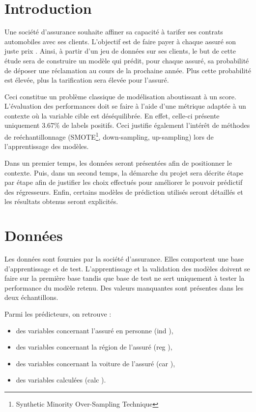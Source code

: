 \documentclass[french]{article}
\begin{document}
\begin{multicols}{2}
\section{Introduction}


Une société d'assurance souhaite affiner sa capacité à tarifer ses contrats automobiles avec ses clients. L'objectif est de faire payer à chaque assuré son \og juste prix \fg{}. Ainsi, à partir d'un jeu de données sur ses clients, le but de cette étude sera de construire un modèle qui prédit, pour chaque assuré, sa probabilité de déposer une réclamation au cours de la prochaine année. Plus cette probabilité est élevée, plus la tarification sera élevée pour l'assuré.


Ceci constitue un problème classique de modélisation aboutissant à un score. L'évaluation des performances doit se faire à l'aide d'une métrique adaptée à un contexte où la variable cible est déséquilibrée. En effet, celle-ci présente uniquement 3.67\% de labels positifs. Ceci justifie également l'intérêt de méthodes de reéchantillonnage (SMOTE\footnote{Synthetic Minority Over-Sampling Technique}, down-sampling, up-sampling) lors de l'apprentissage des modèles.

Dans un premier temps, les données seront présentées afin de positionner le contexte. Puis, dans un second temps, la démarche du projet sera décrite étape par étape afin de justifier les choix effectués pour améliorer le pouvoir prédictif des régresseurs. Enfin, certains modèles de prédiction utilisés seront détaillés et les résultats obtenus seront explicités.

\section{Données}

Les données sont fournies par la société d'assurance. Elles comportent une base d'apprentissage et de test. L'apprentissage et la validation des modèles doivent se faire sur la première base tandis que base de test ne sert uniquement à tester la performance du modèle retenu. Des valeurs manquantes sont présentes dans les deux échantillons.

\noindent Parmi les prédicteurs, on retrouve :
\begin{itemize}
    \item des variables concernant l'assuré en personne (\og ind \fg{}),
    \item des variables concernant la région de l'assuré (\og reg \fg{}),
    \item des variables concernant la voiture de l'assuré (\og car \fg{}),
    \item des variables calculées (\og calc \fg{}).
\end{itemize}


\end{multicols}
\end{document}
